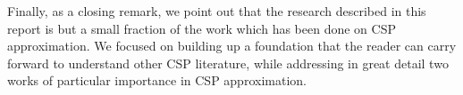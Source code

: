 Finally, as a closing remark, we point out that the research described in this report is but a small fraction of the work which has been done on CSP approximation. We focused on building up a foundation that the reader can carry forward to understand other CSP literature, while addressing in great detail two works of particular importance in CSP approximation.
\iffalse
Note the following problem specific specific LP relaxations \cite{GoeWil94,Asa97,Yan94}.
\begin{itemize}
\item this thing
\item this thing as well
\item also this thing
\end{itemize}
k-SAT
graph coloring
\fi